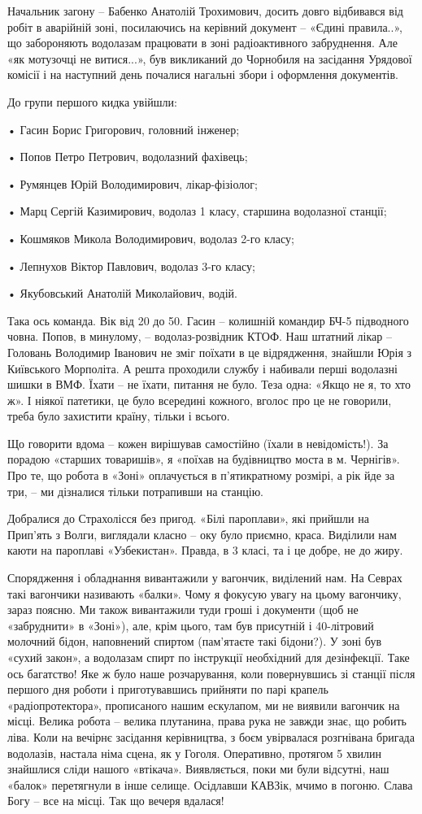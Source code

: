 Начальник загону – Бабенко Анатолій Трохимович, досить довго відбивався від
робіт в аварійній зоні, посилаючись на керівний документ – «Єдині правила..»,
що забороняють водолазам працювати в зоні радіоактивного забруднення. Але «як
мотузочці не витися...», був викликаний до Чорнобиля на засідання Урядової
комісії і на наступний день почалися нагальні збори і оформлення документів.

До групи першого кидка увійшли:

• Гасин Борис Григорович, головний інженер;

• Попов Петро Петрович, водолазний фахівець;

• Румянцев Юрій Володимирович, лікар-фізіолог;

• Марц Сергій Казимирович, водолаз 1 класу, старшина водолазної станції;

• Кошмяков Микола Володимирович, водолаз 2-го класу;

• Лепнухов Віктор Павлович, водолаз 3-го класу;

• Якубовський Анатолій Миколайович, водій.

Така ось команда. Вік від 20 до 50. Гасин – колишній командир БЧ-5 підводного
човна. Попов, в минулому, – водолаз-розвідник КТОФ. Наш штатний лікар –
Головань Володимир Іванович не зміг поїхати в це відрядження, знайшли Юрія з
Київського Морполіта. А решта проходили службу і набивали перші водолазні шишки
в ВМФ. Їхати – не їхати, питання не було. Теза одна: «Якщо не я, то хто ж». І
ніякої патетики, це було всередині кожного, вголос про це не говорили, треба
було захистити країну, тільки і всього.

Що говорити вдома – кожен вирішував самостійно (їхали в невідомість!). За
порадою «старших товаришів», я «поїхав на будівництво моста в м. Чернігів». Про
те, що робота в «Зоні» оплачується в п'ятикратному розмірі, а рік йде за три, –
ми дізналися тільки потрапивши на станцію.

Добралися до Страхолісся без пригод. «Білі пароплави», які прийшли на Прип'ять
з Волги, виглядали класно – оку було приємно, краса. Виділили нам каюти на
пароплаві «Узбекистан». Правда, в 3 класі, та і це добре, не до жиру.

Спорядження і обладнання вивантажили у вагончик, виділений нам. На Севрах такі
вагончики називають «балки». Чому я фокусую увагу на цьому вагончику, зараз
поясню. Ми також вивантажили туди гроші і документи (щоб не «забруднити» в
«Зоні»), але, крім цього, там був присутній і 40-літровий молочний бідон,
наповнений спиртом (пам'ятаєте такі бідони?). У зоні був «сухий закон», а
водолазам спирт по інструкції необхідний для дезінфекції. Таке ось багатство!
Яке ж було наше розчарування, коли повернувшись зі станції після першого дня
роботи і приготувавшись прийняти по парі крапель «радіопротектора», прописаного
нашим ескулапом, ми не виявили вагончик на місці. Велика робота – велика
плутанина, права рука не завжди знає, що робить ліва. Коли на вечірнє засідання
керівництва, з боєм увірвалася розгнівана бригада водолазів, настала німа
сцена, як у Гоголя. Оперативно, протягом 5 хвилин знайшлися сліди нашого
«втікача». Виявляється, поки ми були відсутні, наш «балок» перетягнули в інше
селище. Осідлавши КАВЗік, мчимо в погоню. Слава Богу – все на місці. Так що
вечеря вдалася!

